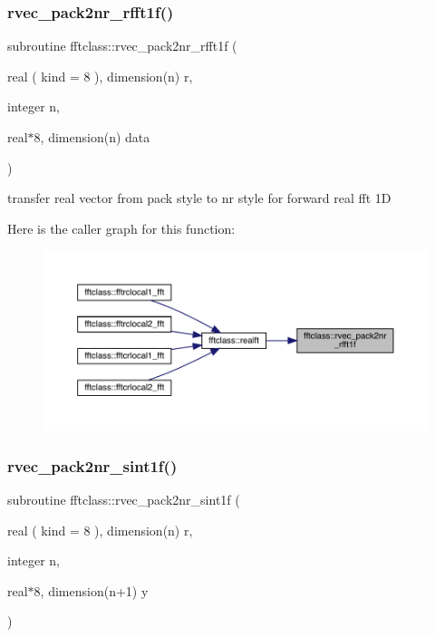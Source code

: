 \subsubsection{\texorpdfstring{rvec\_pack2nr\_rfft1f()}{rvec\_pack2nr\_rfft1f()}}
{\footnotesize\ttfamily subroutine fftclass\+::rvec\+\_\+pack2nr\+\_\+rfft1f (\begin{DoxyParamCaption}\item[{real ( kind = 8 ), dimension(n)}]{r,  }\item[{integer}]{n,  }\item[{real$\ast$8, dimension(n)}]{data }\end{DoxyParamCaption})}



transfer real vector from pack style to nr style for forward real fft 1D 

Here is the caller graph for this function\+:\nopagebreak
\begin{figure}[H]
\begin{center}
\leavevmode
\includegraphics[width=350pt]{namespacefftclass_ac898bf50e64ca8c43e8d9fa0c2c85919_icgraph}
\end{center}
\end{figure}
\mbox{\label{namespacefftclass_a667b3d13eccd40bf9e60f379f6d44e04}} 
\subsubsection{\texorpdfstring{rvec\_pack2nr\_sint1f()}{rvec\_pack2nr\_sint1f()}}
{\footnotesize\ttfamily subroutine fftclass\+::rvec\+\_\+pack2nr\+\_\+sint1f (\begin{DoxyParamCaption}\item[{real ( kind = 8 ), dimension(n)}]{r,  }\item[{integer}]{n,  }\item[{real$\ast$8, dimension(n+1)}]{y }\end{DoxyParamCaption})}




